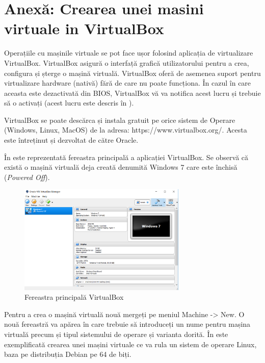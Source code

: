 \section{Anexă: Crearea unei masini virtuale in VirtualBox}
\label{sec:vm-virtualbox}

Operațiile cu mașinile virtuale se pot face ușor folosind aplicația de
virtualizare VirtualBox. VirtualBox asigură o interfață grafică utilizatorului
pentru a crea, configura și șterge o mașină virtuală. VirtualBox oferă de
asemenea suport pentru virtualizare hardware (nativă) fără de care nu poate
funcționa. În cazul în care aceasta este dezactivată din BIOS, VirtualBox vă va
notifica acest lucru și trebuie să o activați (acest lucru este descris în
).

VirtualBox se poate descărca și instala gratuit pe orice sistem de Operare
(Windows, Linux, MacOS) de la adresa: https://www.virtualbox.org/. Acesta este
întreținut și dezvoltat de către Oracle.

În  este reprezentată fereastra
principală a aplicației VirtualBox. Se observă că există o mașină virtuală deja
creată denumită Windows 7 care este închisă (\textit{Powered Off}).

\begin{figure}[!htbp]
	\centering
	\includegraphics[width=8cm]{chapters/14-vm/img/vbox-main-img.png}
	\caption{Fereastra principală VirtualBox}
	\label{fig:vm-vbox-main}
\end{figure}

Pentru a crea o mașină virtuală nouă mergeți pe meniul Machine -> New. O nouă
fereastră va apărea în care trebuie să introduceți un nume pentru mașina
virtuală precum și tipul sistemului de operare și varianta dorită. În
 este exemplificată crearea unei
mașini virtuale ce va rula un sistem de operare Linux, baza pe distribuția
Debian pe 64 de biți.

